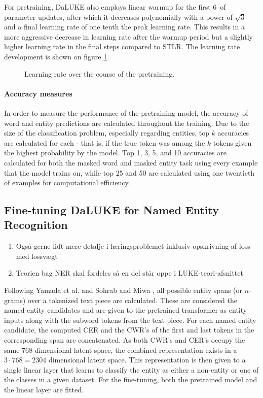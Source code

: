 \documentclass[main.tex]{subfiles}
\begin{document}
For pretraining, DaLUKE also employs linear warmup for the first 6\pro\ of parameter updates, after which it decreases polynomially with a power of $ \sqrt{3} $ and a final learning rate of one tenth the peak learning rate.
This results in a more aggressive decrease in learning rate after the warmup period but a slightly higher learning rate in the final steps compared to STLR.
The learning rate development is shown on figure \ref{fig:lr}.
\begin{figure}[H]
    \centering
    \caption{Learning rate over the course of the pretraining.}
    \label{fig:lr}
\end{figure}\noindent

\paragraph{Accuracy measures}
In order to measure the performance of the pretraining model, the accuracy of word and entity predictions are calculated throughout the training.
Due to the size of the classification problem, especially regarding entities, top $ k $ accuracies are calculated for each - that is, if the true token was among the $ k $ tokens given the highest probability by the model.
Top 1, 3, 5, and 10 accuracies are calculated for both the masked word and masked entity task using every example that the model trains on, while top 25 and 50 are calculated using one twentieth of examples for computational efficiency.

\subsection{Fine-tuning DaLUKE for Named Entity Recognition}%
\label{sub:finetune-ner}
\begin{enumerate}
    \item Også gerne lidt mere detalje i læringsproblemet inklusiv opskrivning af loss med lossvægt
    \item Teorien bag NER skal fordeles så en del står oppe i LUKE-teori-afsnittet
\end{enumerate}
Following Yamada et al. \cite{yamada2020luke} and Sohrab and Miwa \cite{sohrab2018nestedner}, all possible entity spans (or $n$-grams) over a tokenized text piece are calculated.
These are considered the named entity candidates and are given to the pretrained transformer as entity inputs along with the subword tokens from the text piece.
For each named entity candidate, the computed CER and the CWR's of the first and last tokens in the corresponding span are concatenated.
As both CWR's and CER's occupy the same 768 dimensional latent space, the combined representation exists in a $ 3\cdot 768 = 2304 $ dimensional latent space.
This representation is then given to a single linear layer that learns to classify the entity as either a non-entity or one of the classes in a given dataset.
For the fine-tuning, both the pretrained model and the linear layer are fitted.
\end{document}
